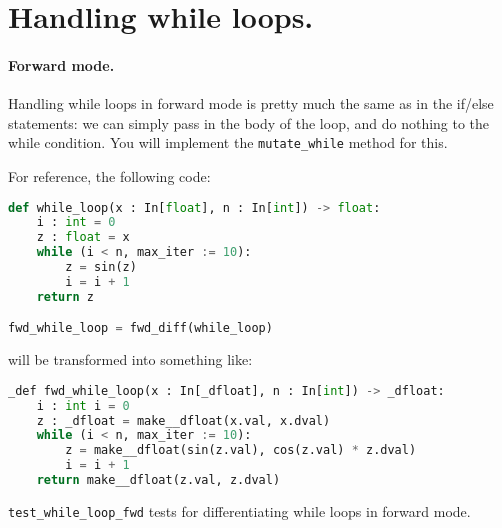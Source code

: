 \section{Handling while loops.}

\paragraph{Forward mode.} Handling while loops in forward mode is pretty much the same as in the if/else statements: we can simply pass in the body of the loop, and do nothing to the while condition. You will implement the \lstinline{mutate_while} method for this.

For reference, the following code:
\begin{lstlisting}[language=Python]
def while_loop(x : In[float], n : In[int]) -> float:
    i : int = 0
    z : float = x
    while (i < n, max_iter := 10):
        z = sin(z)
        i = i + 1
    return z

fwd_while_loop = fwd_diff(while_loop)
\end{lstlisting}
will be transformed into something like:
\begin{lstlisting}[language=Python]
_def fwd_while_loop(x : In[_dfloat], n : In[int]) -> _dfloat:
    i : int i = 0
    z : _dfloat = make__dfloat(x.val, x.dval)
    while (i < n, max_iter := 10):
        z = make__dfloat(sin(z.val), cos(z.val) * z.dval)
        i = i + 1
    return make__dfloat(z.val, z.dval)
\end{lstlisting}

\lstinline{test_while_loop_fwd} tests for differentiating while loops in forward mode.


